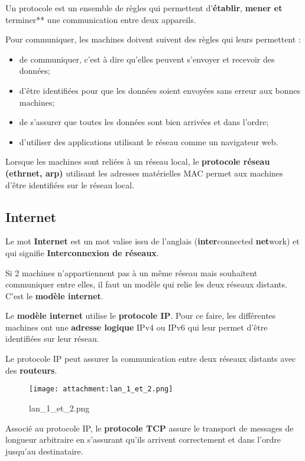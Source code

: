 \documentclass[11pt]{article}
\providecommand{\tightlist}{%
      \setlength{\itemsep}{0pt}\setlength{\parskip}{0pt}}
\begin{document}
Un protocole est un ensemble de règles qui permettent
d'\textbf{établir}, \textbf{mener et }terminer** une communication entre
deux appareils.

Pour communiquer, les machines doivent suivent des règles qui leurs
permettent :

\begin{itemize}
\tightlist
\item
  de communiquer, c'est à dire qu'elles peuvent s'envoyer et recevoir
  des données;
\item
  d'être identifiées pour que les données soient envoyées sans erreur
  aux bonnes machines;
\item
  de s'assurer que toutes les données sont bien arrivées et dans
  l'ordre;
\item
  d'utiliser des applications utilisant le réseau comme un navigateur
  web.
\end{itemize}

Lorsque les machines sont reliées à un réseau local, le
\textbf{protocole réseau (ethrnet, arp)} utilisant les adresses
matérielles MAC permet aux machines d'être identifiées sur le réseau
local.

    \hypertarget{internet}{%
\subsection{Internet}\label{internet}}

Le mot \textbf{Internet} est un mot valise issu de l'anglais
(\textbf{inter}connected \textbf{net}work) et qui signifie
\textbf{Interconnexion de réseaux}.

Si 2 machines n'appartiennent pas à un même réseau mais souhaitent
communiquer entre elles, il faut un modèle qui relie les deux réseaux
distants. C'est le \textbf{modèle internet}.

Le \textbf{modèle internet} utilise le \textbf{protocole IP}. Pour ce
faire, les différentes machines ont une \textbf{adresse logique} IPv4 ou
IPv6 qui leur permet d'être identifiées sur leur réseau.

Le protocole IP peut assurer la communication entre deux réseaux
distants avec des \textbf{routeurs}.

    \begin{figure}
\centering
\texttt{[image: attachment:lan\_1\_et\_2.png]}
\caption{lan\_1\_et\_2.png}
\end{figure}

    Associé au protocole IP, le \textbf{protocole TCP} assure le transport
de messages de longueur arbitraire en s'assurant qu'ils arrivent
correctement et dans l'ordre jusqu'au destinataire.
\end{document}
